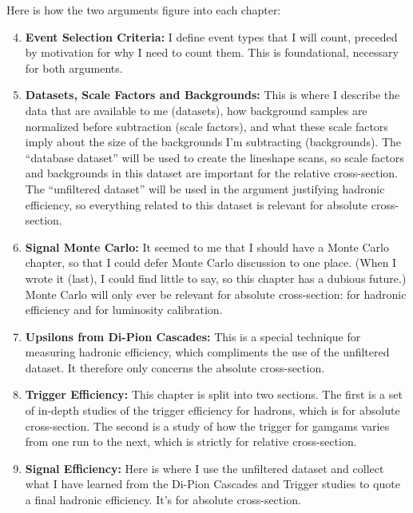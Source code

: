 \documentclass[12pt]{article}
\begin{document}
Here is how the two arguments figure into each chapter:
\begin{enumerate}
\setcounter{enumi}{3}

  \item {\bf Event Selection Criteria:} I define event types that I
    will count, preceded by motivation for why I need to count them.
    This is foundational, necessary for both arguments.

  \item {\bf Datasets, Scale Factors and Backgrounds:} This is where I
    describe the data that are available to me (datasets), how
    background samples are normalized before subtraction (scale
    factors), and what these scale factors imply about the size of the
    backgrounds I'm subtracting (backgrounds).  The ``database
    dataset'' will be used to create the lineshape scans, so scale
    factors and backgrounds in this dataset are important for the
    relative cross-section.  The ``unfiltered dataset'' will be
    used in the argument justifying hadronic efficiency, so everything
    related to this dataset is relevant for absolute cross-section.

  \item {\bf Signal Monte Carlo:} It seemed to me that I should have a
    Monte Carlo chapter, so that I could defer Monte Carlo discussion
    to one place.  (When I wrote it (last), I could find little to
    say, so this chapter has a dubious future.)  Monte Carlo will only
    ever be relevant for absolute cross-section: for hadronic
    efficiency and for luminosity calibration.

  \item {\bf Upsilons from Di-Pion Cascades:} This is a special
    technique for measuring hadronic efficiency, which compliments the
    use of the unfiltered dataset.  It therefore only concerns the
    absolute cross-section.

  \item {\bf Trigger Efficiency:} This chapter is split into two
    sections.  The first is a set of in-depth studies of the trigger
    efficiency for hadrons, which is for absolute cross-section.  The
    second is a study of how the trigger for gamgams varies from one
    run to the next, which is strictly for relative cross-section.

  \item {\bf Signal Efficiency:} Here is where I use the unfiltered
    dataset and collect what I have learned from the Di-Pion Cascades
    and Trigger studies to quote a final hadronic efficiency.  It's
    for absolute cross-section.


\end{enumerate}
\end{document}
